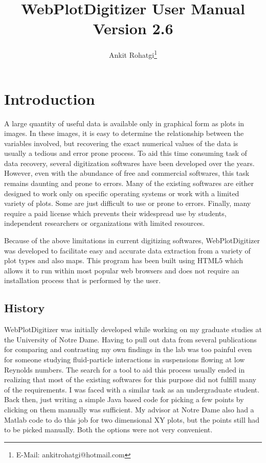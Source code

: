 \documentclass[letterpaper]{article}
\begin{document}
\title{WebPlotDigitizer User Manual\\ Version 2.6}
\author{Ankit Rohatgi\footnote{E-Mail: ankitrohatgi@hotmail.com}}
\maketitle
\tableofcontents
\newpage
\section{Introduction}
A large quantity of useful data is available only in graphical form as plots in images. In these images, it is easy to determine the relationship between the variables involved, but recovering the exact numerical values of the data is usually a tedious and error prone process. To aid this time consuming task of data recovery, several digitization softwares have been developed over the years. However, even with the abundance of free and commercial softwares, this task remains daunting and prone to errors. Many of the existing softwares are either designed to work only on specific operating systems or work with a limited variety of plots. Some are just difficult to use or prone to errors. Finally, many require a paid license which prevents their widespread use by students, independent researchers or organizations with limited resources.

Because of the above limitations in current digitizing softwares, WebPlotDigitizer was developed to facilitate easy and accurate data extraction from a variety of plot types and also maps. This program has been built using HTML5 which allows it to run within most popular web browsers and does not require an installation process that is performed by the user.

\subsection{History}
WebPlotDigitizer was initially developed while working on my graduate studies at the University of Notre Dame. Having to pull out data from several publications for comparing and contrasting my own findings in the lab was too painful even for someone studying fluid-particle interactions in suspensions flowing at low Reynolds numbers. The search for a tool to aid this process usually ended in realizing that most of the existing softwares for this purpose did not fulfill many of the requirements. I was faced with a similar task as an undergraduate student. Back then, just writing a simple Java based code for picking a few points by clicking on them manually was sufficient. My advisor at Notre Dame also had a Matlab code to do this job for two dimensional XY plots, but the points still had to be picked manually. Both the options were not very convenient.
\end{document}
